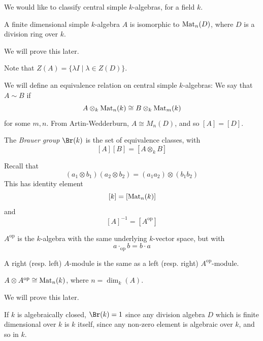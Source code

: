 \documentclass{article}
\begin{document}
We would like to classify central simple \(k\)-algebras, for a field \(k\).

\begin{theorem}
    \label{thm:artin-wedderburn}
    A finite dimensional simple \(k\)-algebra \(A\) is isomorphic to \(\operatorname{Mat}_n(D)\), where \(D\) is a division ring over \(k\).
\end{theorem}

We will prove this later.

\begin{remark}
    Note that \(Z(A) = \{\lambda I \mid \lambda \in Z(D)\}\).
\end{remark}

We will define an equivalence relation on central simple \(k\)-algebras: We say that \(A \sim B\) if
\[A\otimes_k \operatorname{Mat}_n(k) \cong B \otimes_k \operatorname{Mat}_m(k)\]
for some \(m, n\). From Artin-Wedderburn, \(A \cong M_n(D)\), and so \([A] = [D]\).

\begin{definition}
    The \emph{Brauer group} \(\Br(k)\) is the set of equivalence classes, with
    \[[A][B] = [A \otimes_k B]\]
\end{definition}

Recall that
\[(a_1\otimes b_1)(a_2 \otimes b_2) = (a_1a_2)\otimes (b_1b_2)\]
This has identity element
\[[k] = [\operatorname{Mat}_n(k)]\]
and
\[[A]^{-1} = [A^\mathrm{op}]\]

\lec

\begin{definition}
    \(A^\mathrm{op}\) is the \(k\)-algebra with the same underlying \(k\)-vector space, but with
    \[a \cdot_\mathrm{op} b = b \cdot a\]
\end{definition}

\begin{remark}
    A right (resp. left) \(A\)-module is the same as a left (resp. right) \(A^\mathrm{op}\)-module.
\end{remark}

\begin{lemma}
    \(A \otimes A^\mathrm{op} \cong \operatorname{Mat}_n(k)\), where \(n = \dim_k(A)\).
\end{lemma}

We will prove this later.

\begin{example}
    If \(k\) is algebraically closed, \(\Br(k) = 1\) since any division algebra \(D\) which is finite dimensional over \(k\) is \(k\) itself, since any non-zero element is algebraic over \(k\), and so in \(k\).
\end{example}
\end{document}
